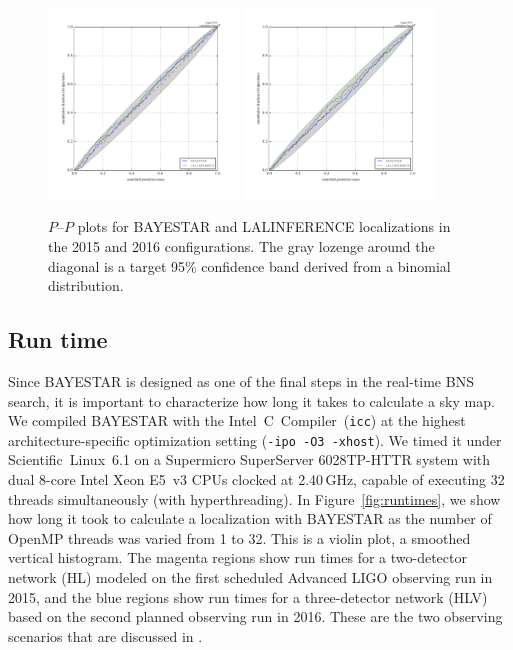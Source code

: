 \documentclass[amsmath,amssymb,aps,prx,reprint,nopreprintnumbers,nofootinbib,showpacs]{revtex4-1}
\begin{document}
\begin{figure}
    \begin{center}
        \includegraphics[width=0.45\textwidth]{2015-pp}
        \includegraphics[width=0.45\textwidth]{2016-pp}
    \end{center}
    \caption[\acs{BAYESTAR} $P$\nobreakdashes--$P$ plots]{\label{fig:pp}$P$\nobreakdashes--$P$ plots for \ac{BAYESTAR} and LALINFERENCE localizations in the 2015 and 2016 configurations. The gray lozenge around the diagonal is a target 95\% confidence band derived from a binomial distribution.}
\end{figure}

\subsection{Run time}
\label{sec:run-time}

Since \ac{BAYESTAR} is designed as one of the final steps in the real\nobreakdashes-time \ac{BNS} search, it is important to characterize how long it takes to calculate a sky map. We compiled \ac{BAYESTAR} with the Intel~C~Compiler~(\texttt{icc}) at the highest architecture\nobreakdashes-specific optimization setting (\texttt{-ipo~-O3~-xhost}). We timed it under Scientific~Linux~6.1 on a Supermicro SuperServer 6028TP\nobreakdashes-HTTR system with dual 8\nobreakdashes-core Intel Xeon E5~v3 CPUs clocked at 2.40\,GHz, capable of executing 32 threads simultaneously (with hyperthreading). In Figure~\ref{fig:runtimes}, we show how long it took to calculate a localization with \ac{BAYESTAR} as the number of OpenMP threads was varied from 1 to 32. This is a violin plot, a smoothed vertical histogram. The magenta regions show run times for a two\nobreakdashes-detector network (HL) modeled on the first scheduled Advanced \ac{LIGO} observing run in 2015, and the blue regions show run times for a three\nobreakdashes-detector network (HLV) based on the second planned observing run in 2016. These are the two observing scenarios that are discussed in \cite{FirstTwoYears}.
\end{document}
